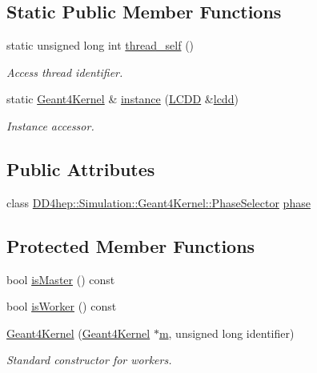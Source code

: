 \subsection*{Static Public Member Functions}
\begin{DoxyCompactItemize}
\item 
static unsigned long int \hyperlink{class_d_d4hep_1_1_simulation_1_1_geant4_kernel_a6f7fb6760f8432658a837a65bb557fe5}{thread\+\_\+self} ()
\begin{DoxyCompactList}\small\item\em Access thread identifier. \end{DoxyCompactList}\item 
static \hyperlink{class_d_d4hep_1_1_simulation_1_1_geant4_kernel}{Geant4\+Kernel} \& \hyperlink{class_d_d4hep_1_1_simulation_1_1_geant4_kernel_a791f6c4b8f9257f98d453457655870de}{instance} (\hyperlink{class_d_d4hep_1_1_simulation_1_1_geant4_kernel_a190e652b62ebce3db3372c4265ffa5a3}{L\+C\+DD} \&\hyperlink{class_d_d4hep_1_1_simulation_1_1_geant4_kernel_ad58adb3734f2701198b8915a80cf4cdc}{lcdd})
\begin{DoxyCompactList}\small\item\em Instance accessor. \end{DoxyCompactList}\end{DoxyCompactItemize}
\subsection*{Public Attributes}
\begin{DoxyCompactItemize}
\item 
class \hyperlink{class_d_d4hep_1_1_simulation_1_1_geant4_kernel_1_1_phase_selector}{D\+D4hep\+::\+Simulation\+::\+Geant4\+Kernel\+::\+Phase\+Selector} \hyperlink{class_d_d4hep_1_1_simulation_1_1_geant4_kernel_ae7d402daf48f3cd062f1617c5a7ee429}{phase}
\end{DoxyCompactItemize}
\subsection*{Protected Member Functions}
\begin{DoxyCompactItemize}
\item 
bool \hyperlink{class_d_d4hep_1_1_simulation_1_1_geant4_kernel_a7913e7e64c2adfdc06339feab56e606f}{is\+Master} () const
\item 
bool \hyperlink{class_d_d4hep_1_1_simulation_1_1_geant4_kernel_a08022ebde7100ab9d1b4d7bbd9520d62}{is\+Worker} () const
\item 
\hyperlink{class_d_d4hep_1_1_simulation_1_1_geant4_kernel_ad73b43c4abdbae6586b77ffdb06492d1}{Geant4\+Kernel} (\hyperlink{class_d_d4hep_1_1_simulation_1_1_geant4_kernel}{Geant4\+Kernel} $\ast$\hyperlink{_volumes_8cpp_a6fc379aaec47ce424b00d8ffda2a6c59}{m}, unsigned long identifier)
\begin{DoxyCompactList}\small\item\em Standard constructor for workers. \end{DoxyCompactList}\end{DoxyCompactItemize}

